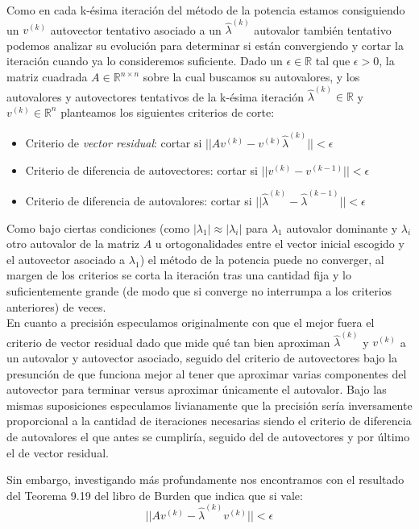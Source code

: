 Como en cada k-ésima iteración del método de la potencia estamos consiguiendo un $v^{(k)}$ autovector tentativo asociado a un $\hat{\lambda}^{(k)}$ autovalor también tentativo podemos analizar su evolución para determinar si están convergiendo y cortar la iteración cuando ya lo consideremos suficiente. Dado un $\epsilon \in \mathds{R}$ tal que $\epsilon > 0$, la matriz cuadrada $A\in \mathds{R}^{n\times n}$ sobre la cual buscamos su autovalores, y los autovalores y autovectores tentativos de la k-ésima iteración $\hat{\lambda}^{(k)} \in \mathds{R}$ y $v^{(k)} \in \mathds{R}^{n}$ planteamos los siguientes criterios de corte:

\begin{itemize}
    \item Criterio de \textit{vector residual}: cortar si $|| A v^{(k)} - v^{(k)}\hat{\lambda}^{(k)} || < \epsilon$
    \item Criterio de diferencia de autovectores: cortar si $|| v^{(k)} - v^{(k-1)} || < \epsilon$
    \item Criterio de diferencia de autovalores: cortar si $|| \hat{\lambda}^{(k)} - \hat{\lambda}^{(k-1)} || < \epsilon$
\end{itemize}

Como bajo ciertas condiciones (como $|\lambda_1| \approx |\lambda_i|$ para $\lambda_1$ autovalor dominante y $\lambda_i$ otro autovalor de la matriz $A$ u ortogonalidades entre el vector inicial escogido y el autovector asociado a $\lambda_1$) el método de la potencia puede no converger, al margen de los criterios se corta la iteración tras una cantidad fija y lo suficientemente grande (de modo que si converge no interrumpa a los criterios anteriores) de veces. \\

En cuanto a precisión especulamos originalmente con que el mejor fuera el criterio de vector residual dado que mide qué tan bien aproximan $\hat{\lambda}^{(k)}$ y $v^{(k)}$ a un autovalor y autovector asociado, seguido del criterio de autovectores bajo la presunción de que funciona mejor al tener que aproximar varias componentes del autovector para terminar versus aproximar únicamente el autovalor. Bajo las mismas suposiciones especulamos livianamente que la precisión sería inversamente proporcional a la cantidad de iteraciones necesarias siendo el criterio de diferencia de autovalores el que antes se cumpliría, seguido del de autovectores y por último el de vector residual.

Sin embargo, investigando más profundamente nos encontramos con el resultado del Teorema 9.19 del libro de Burden \cite{Burden} que indica que si vale:
\begin{equation}
||A v^{(k)}-\hat{\lambda}^{(k)}v^{(k)} || < \epsilon
\end{equation}

